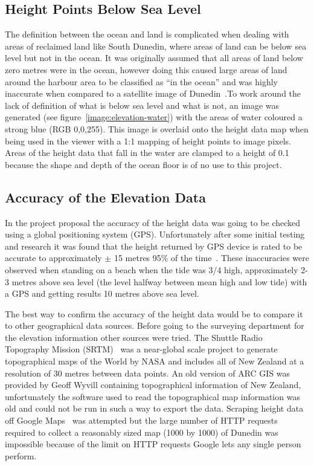 \documentclass[12pt]{report}
\begin{document}
\subsection{Height Points Below Sea Level}
The definition between the ocean and land is complicated when dealing with areas of reclaimed land like South Dunedin, where areas of land can be below sea level but not in the ocean. It was originally assumed that all areas of land below zero metres were in the ocean, however doing this caused large areas of land around the harbour area to be classified as ``in the ocean'' and was highly inaccurate when compared to a satellite image of Dunedin~\cite{gmaps}.To work around the lack of definition of what is below sea level and what is not, an image was generated (see figure~\ref{image:elevation-water}) with the areas of water coloured a strong blue (RGB 0,0,255). This image is overlaid onto the height data map when being used in the viewer with a 1:1 mapping of height points to image pixels. Areas of the height data that fall in the water are clamped to a height of 0.1 because the shape and depth of the ocean floor is of no use to this project.

\subsection{Accuracy of the Elevation Data}
In the project proposal the accuracy of the height data was going to be checked using a global positioning system (GPS). Unfortunately after some initial testing and research it was found that the height returned by GPS device is rated to be accurate to approximately $\pm$ 15 metres 95\% of the time~\cite{gpsaltitude}. These inaccuracies were observed when standing on a beach when the tide was 3/4 high, approximately 2-3 metres above sea level (the level halfway between mean high and low tide)  with a GPS and getting results 10 metres above sea level.

The best way to confirm the accuracy of the height data would be to compare it to other geographical data sources. Before going to the surveying department for the elevation information other sources were tried. The Shuttle Radio Topography Mission (SRTM)~\cite{srtm} was a near-global scale project to generate topographical maps of the World by NASA and includes all of New Zealand at a resolution of 30 metres between data points. An old version of ARC GIS was provided by Geoff Wyvill containing topographical information of New Zealand, unfortunately the software used to read the topographical map information was old and could not be run in such a way to export the data. Scraping height data off Google Maps~\cite{gmaps} was attempted but the large number of HTTP requests required to collect a reasonably sized map (1000 by 1000) of Dunedin was impossible because of the limit on HTTP requests Google lets any single person perform.
\end{document}
